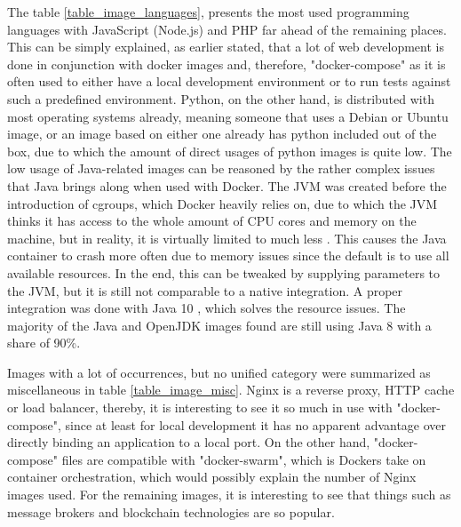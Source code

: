 The table \ref{table_image_languages}, presents the most used programming languages with JavaScript (Node.js) and PHP far ahead of the remaining places. This can be simply explained, as earlier stated, that a lot of web development is done in conjunction with docker images and, therefore, "docker-compose" as it is often used to either have a local development environment or to run tests against such a predefined environment. Python, on the other hand, is distributed with most operating systems already, meaning someone that uses a Debian or Ubuntu image, or an image based on either one already has python included out of the box, due to which the amount of direct usages of python images is quite low.
The low usage of Java-related images can be reasoned by the rather complex issues that Java brings along when used with Docker. The JVM was created before the introduction of cgroups, which Docker heavily relies on, due to which the JVM thinks it has access to the whole amount of CPU cores and memory on the machine, but in reality, it is virtually limited to much less . This causes the Java container to crash more often due to memory issues since the default is to use all available resources. In the end, this can be tweaked by supplying parameters to the JVM, but it is still not comparable to a native integration. A proper integration was done with Java 10 , which solves the resource issues. The majority of the Java and OpenJDK images found are still using Java 8 with a share of 90\%.

Images with a lot of occurrences, but no unified category were summarized as miscellaneous in table \ref{table_image_misc}. Nginx is a reverse proxy, HTTP cache or load balancer, thereby, it is interesting to see it so much in use with "docker-compose", since at least for local development it has no apparent advantage over directly binding an application to a local port. On the other hand, "docker-compose" files are compatible with "docker-swarm", which is Dockers take on container orchestration, which would possibly explain the number of Nginx images used.
For the remaining images, it is interesting to see that things such as message brokers and blockchain technologies are so popular.

